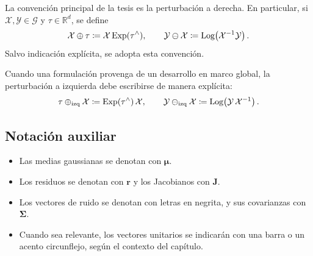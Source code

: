 La convención principal de la tesis es la perturbación a derecha. En particular, si $\mathcal{X}, \mathcal{Y} \in \mathcal{G}$ y $\tau \in \mathbb{R}^d$, se define
\[
\mathcal{X} \oplus \tau \coloneq \mathcal{X}\,\text{Exp}(\tau^\wedge),
\qquad
\mathcal{Y} \ominus \mathcal{X} \coloneq \text{Log}\!\left(\mathcal{X}^{-1}\mathcal{Y}\right).
\]
Salvo indicación explícita, se adopta esta convención.

Cuando una formulación provenga de un desarrollo en marco global, la perturbación a izquierda debe escribirse de manera explícita:
\[
\tau \oplus_{\mathrm{izq}} \mathcal{X} \coloneq \text{Exp}(\tau^\wedge)\,\mathcal{X},
\qquad
\mathcal{Y} \ominus_{\mathrm{izq}} \mathcal{X} \coloneq \text{Log}\!\left(\mathcal{Y}\,\mathcal{X}^{-1}\right).
\]

\subsection{Notación auxiliar}

\begin{itemize}
	\item Las medias gaussianas se denotan con $\boldsymbol{\mu}$.
	\item Los residuos se denotan con $\mathbf{r}$ y los Jacobianos con $\mathbf{J}$.
	\item Los vectores de ruido se denotan con letras en negrita, y sus covarianzas con $\boldsymbol{\Sigma}$.
	\item Cuando sea relevante, los vectores unitarios se indicarán con una barra o un acento circunflejo, según el contexto del capítulo.
\end{itemize}
